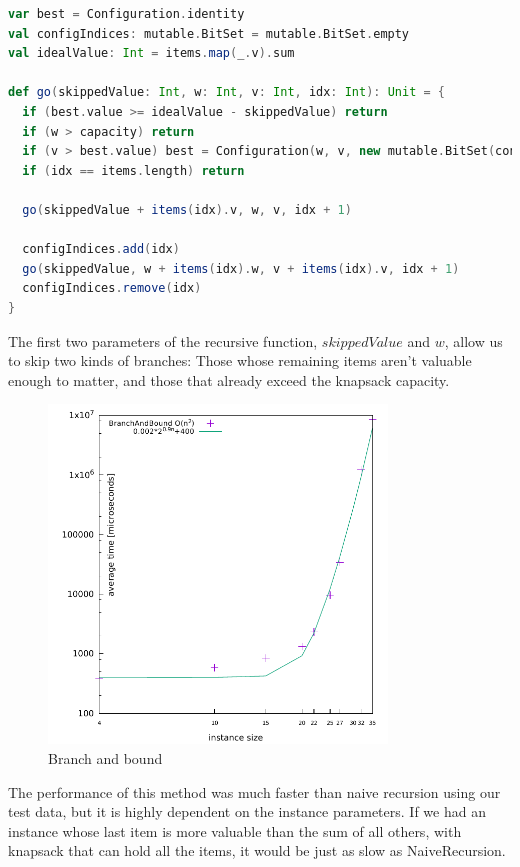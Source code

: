 \documentclass[a4paper,10pt,twocolumn]{article}
\begin{document}
\begin{lstlisting}[frame=tlrb,language=scala,basicstyle=\scriptsize,label=branchAndBoundCode,caption=BranchAndBound]
var best = Configuration.identity
val configIndices: mutable.BitSet = mutable.BitSet.empty
val idealValue: Int = items.map(_.v).sum

def go(skippedValue: Int, w: Int, v: Int, idx: Int): Unit = {
  if (best.value >= idealValue - skippedValue) return
  if (w > capacity) return
  if (v > best.value) best = Configuration(w, v, new mutable.BitSet(configIndices.toBitMask))
  if (idx == items.length) return

  go(skippedValue + items(idx).v, w, v, idx + 1)

  configIndices.add(idx)
  go(skippedValue, w + items(idx).w, v + items(idx).v, idx + 1)
  configIndices.remove(idx)
}
\end{lstlisting}

The first two parameters of the recursive function, $skippedValue$ and $w$, allow us to skip two kinds of branches:
Those whose remaining items aren't valuable enough to matter, and those that already exceed the knapsack
capacity.

\begin{figure}[H]
  \begin{center}
    \hspace*{-0.5cm}\includegraphics[width=9cm,height=9cm]{gnuplot/pdf/BranchAndBound.pdf}
  \end{center}
  \caption{Branch and bound}\label{fig1}
\end{figure}

The performance of this method was much faster than naive recursion using our test data, but it is highly dependent on
the instance parameters. If we had an instance whose last item is more valuable than the sum of all others, with
knapsack that can hold all the items, it would be just as slow as NaiveRecursion.
\end{document}
